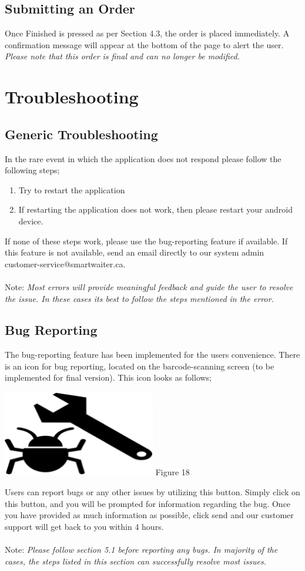 \documentclass[12pt, titlepage]{article}
\begin{document}
\subsection{Submitting an Order}
Once Finished is pressed as per Section 4.3, the order is placed immediately. A confirmation message will appear at the bottom of the page to alert the user.  \emph{Please note that this order is final and can no longer be modified.}

\section{Troubleshooting}
\subsection{Generic Troubleshooting}
In the rare event in which the application does not respond please follow the following steps;
\begin{enumerate}
	\item Try to restart the application
	\item If restarting the application does not work, then please restart your android device.
	\end{enumerate}
	If none of these steps work, please use the bug-reporting feature if available. If this feature is not available, send an email directly to our system admin customer-service@smartwaiter.ca.\\\\
	Note:  \emph{Most errors will provide meaningful feedback and guide the user to resolve the issue. In these cases its best to follow the steps mentioned in the error.}
\subsection{Bug Reporting}
The bug-reporting feature has been implemented for the users convenience. There is an icon for bug reporting, located on the barcode-scanning screen (to be implemented for final version). This icon looks as follows;\\
\begin{center}
	\includegraphics[width=0.5\textwidth]{bugReport.png}
	\linebreak Figure 18
\end{center}
Users can report bugs or any other issues by utilizing this button. Simply click on this button, and you will be prompted for information regarding the bug. Once you have provided as much information as possible, click send and our customer support will get back to you within 4 hours.\\\\
Note:  \emph{Please follow section 5.1 before reporting any bugs.  In majority of the cases, the steps listed in this section can successfully resolve most issues.}
\end{document}
